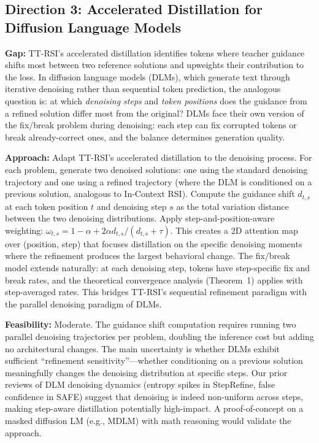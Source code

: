 \documentclass[11pt,a4paper]{article}
\begin{document}
\subsection{Direction 3: Accelerated Distillation for Diffusion Language Models}
\textbf{Gap:} TT-RSI's accelerated distillation identifies tokens where teacher guidance shifts most between two reference solutions and upweights their contribution to the loss. In diffusion language models (DLMs), which generate text through iterative denoising rather than sequential token prediction, the analogous question is: at which \emph{denoising steps} and \emph{token positions} does the guidance from a refined solution differ most from the original? DLMs face their own version of the fix/break problem during denoising: each step can fix corrupted tokens or break already-correct ones, and the balance determines generation quality.

\textbf{Approach:} Adapt TT-RSI's accelerated distillation to the denoising process. For each problem, generate two denoised solutions: one using the standard denoising trajectory and one using a refined trajectory (where the DLM is conditioned on a previous solution, analogous to In-Context RSI). Compute the guidance shift $d_{t,s}$ at each token position $t$ and denoising step $s$ as the total variation distance between the two denoising distributions. Apply step-and-position-aware weighting: $\omega_{t,s} = 1 - \alpha + 2\alpha d_{t,s}/(d_{t,s} + \tau)$. This creates a 2D attention map over (position, step) that focuses distillation on the specific denoising moments where the refinement produces the largest behavioral change. The fix/break model extends naturally: at each denoising step, tokens have step-specific fix and break rates, and the theoretical convergence analysis (Theorem~1) applies with step-averaged rates. This bridges TT-RSI's sequential refinement paradigm with the parallel denoising paradigm of DLMs.

\textbf{Feasibility:} Moderate. The guidance shift computation requires running two parallel denoising trajectories per problem, doubling the inference cost but adding no architectural changes. The main uncertainty is whether DLMs exhibit sufficient ``refinement sensitivity''---whether conditioning on a previous solution meaningfully changes the denoising distribution at specific steps. Our prior reviews of DLM denoising dynamics (entropy spikes in StepRefine, false confidence in SAFE) suggest that denoising is indeed non-uniform across steps, making step-aware distillation potentially high-impact. A proof-of-concept on a masked diffusion LM (e.g., MDLM) with math reasoning would validate the approach.
\end{document}
